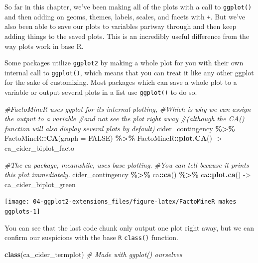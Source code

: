 \documentclass[
]{book}
\newenvironment{Shaded}{\begin{snugshade}}{\end{snugshade}}
\newcommand{\AttributeTok}[1]{\textcolor[rgb]{0.13,0.29,0.53}{#1}}
\newcommand{\CommentTok}[1]{\textcolor[rgb]{0.56,0.35,0.01}{\textit{#1}}}
\newcommand{\ConstantTok}[1]{\textcolor[rgb]{0.56,0.35,0.01}{#1}}
\newcommand{\FunctionTok}[1]{\textcolor[rgb]{0.13,0.29,0.53}{\textbf{#1}}}
\newcommand{\NormalTok}[1]{#1}
\newcommand{\OtherTok}[1]{\textcolor[rgb]{0.56,0.35,0.01}{#1}}
\newcommand{\SpecialCharTok}[1]{\textcolor[rgb]{0.81,0.36,0.00}{\textbf{#1}}}
\begin{document}
So far in this chapter, we've been making all of the plots with a call to \texttt{ggplot()} and then adding on geoms, themes, labels, scales, and facets with \texttt{+}. But we've also been able to save our plots to variables partway through and then keep adding things to the saved plots. This is an incredibly useful difference from the way plots work in base R.

Some packages utilize \texttt{ggplot2} by making a whole plot for you with their own internal call to \texttt{ggplot()}, which means that you can treat it like any other ggplot for the sake of customizing. Most packages which can save a whole plot to a variable or output several plots in a list use \texttt{ggplot()} to do so.

\begin{Shaded}
\begin{Highlighting}[]
\CommentTok{\#FactoMineR uses ggplot for its internal plotting,}
\CommentTok{\#Which is why we can assign the output to a variable}
\CommentTok{\#and not see the plot right away}
\CommentTok{\#(although the CA() function will also display several plots by default)}
\NormalTok{cider\_contingency }\SpecialCharTok{\%\textgreater{}\%}
\NormalTok{  FactoMineR}\SpecialCharTok{::}\FunctionTok{CA}\NormalTok{(}\AttributeTok{graph =} \ConstantTok{FALSE}\NormalTok{) }\SpecialCharTok{\%\textgreater{}\%}
\NormalTok{  FactoMineR}\SpecialCharTok{::}\FunctionTok{plot.CA}\NormalTok{() }\OtherTok{{-}\textgreater{}}\NormalTok{ ca\_cider\_biplot\_facto}

\CommentTok{\#The ca package, meanwhile, uses base plotting.}
\CommentTok{\#You can tell because it prints this plot immediately.}
\NormalTok{cider\_contingency }\SpecialCharTok{\%\textgreater{}\%}
\NormalTok{  ca}\SpecialCharTok{::}\FunctionTok{ca}\NormalTok{() }\SpecialCharTok{\%\textgreater{}\%}
\NormalTok{  ca}\SpecialCharTok{::}\FunctionTok{plot.ca}\NormalTok{() }\OtherTok{{-}\textgreater{}}\NormalTok{ ca\_cider\_biplot\_green}
\end{Highlighting}
\end{Shaded}

\begin{center}\texttt{[image: 04-ggplot2-extensions\_files/figure-latex/FactoMineR makes ggplots-1]} \end{center}

You can see that the last code chunk only output one plot right away, but we can confirm our suspicions with the base \texttt{R} \texttt{class()} function.

\begin{Shaded}
\begin{Highlighting}[]
\FunctionTok{class}\NormalTok{(ca\_cider\_termplot) }\CommentTok{\# Made with ggplot() ourselves}
\end{Highlighting}
\end{Shaded}
\end{document}
